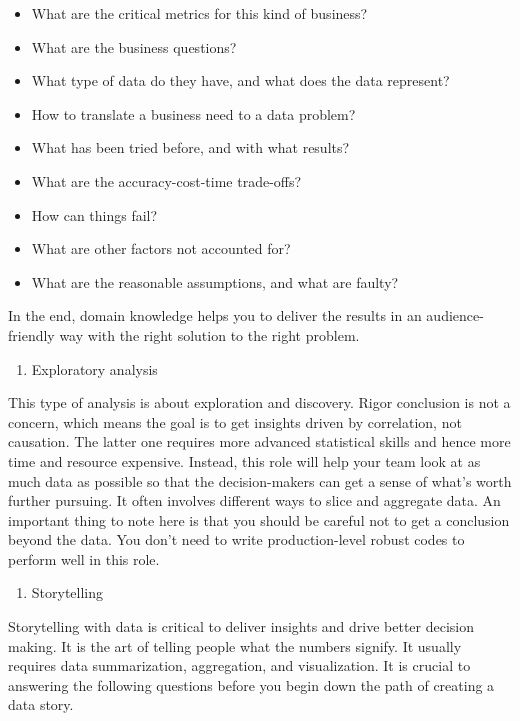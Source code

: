 \documentclass[12pt,]{krantz}
\providecommand{\tightlist}{%
  \setlength{\itemsep}{0pt}\setlength{\parskip}{0pt}}
\begin{document}
\begin{itemize}
\tightlist
\item
  What are the critical metrics for this kind of business?
\item
  What are the business questions?
\item
  What type of data do they have, and what does the data represent?
\item
  How to translate a business need to a data problem?
\item
  What has been tried before, and with what results?
\item
  What are the accuracy-cost-time trade-offs?
\item
  How can things fail?
\item
  What are other factors not accounted for?
\item
  What are the reasonable assumptions, and what are faulty?
\end{itemize}

In the end, domain knowledge helps you to deliver the results in an audience-friendly way with the right solution to the right problem.

\begin{enumerate}
\def\labelenumi{(\arabic{enumi})}
\setcounter{enumi}{1}
\tightlist
\item
  Exploratory analysis
\end{enumerate}

This type of analysis is about exploration and discovery. Rigor conclusion is not a concern, which means the goal is to get insights driven by correlation, not causation. The latter one requires more advanced statistical skills and hence more time and resource expensive. Instead, this role will help your team look at as much data as possible so that the decision-makers can get a sense of what's worth further pursuing. It often involves different ways to slice and aggregate data. An important thing to note here is that you should be careful not to get a conclusion beyond the data. You don't need to write production-level robust codes to perform well in this role.

\begin{enumerate}
\def\labelenumi{(\arabic{enumi})}
\setcounter{enumi}{2}
\tightlist
\item
  Storytelling
\end{enumerate}

Storytelling with data is critical to deliver insights and drive better decision making. It is the art of telling people what the numbers signify. It usually requires data summarization, aggregation, and visualization. It is crucial to answering the following questions before you begin down the path of creating a data story.
\end{document}
